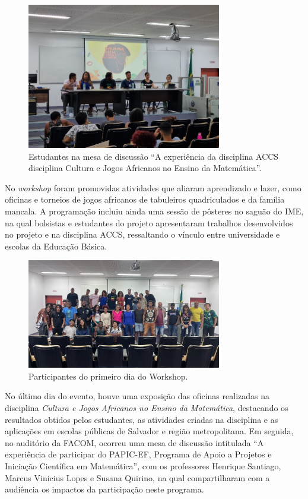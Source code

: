 \documentclass{hipatia}
\begin{document}
\begin{figure}[htb]
    \centering
    \includegraphics[width=8.5cm]{WAM2.jpg}
    \caption{Estudantes na mesa de discussão ``A experiência da disciplina ACCS disciplina Cultura e Jogos Africanos no Ensino da Matemática''.}
 \label{WAM2}
\end{figure}

No \textit{workshop} foram promovidas atividades que aliaram aprendizado e lazer, como oficinas e torneios de jogos africanos de tabuleiros quadriculados e da família mancala. A programação incluiu ainda uma sessão de pôsteres no saguão do IME, na qual bolsistas e estudantes do projeto apresentaram trabalhos desenvolvidos no projeto e na disciplina ACCS, ressaltando o vínculo entre universidade e escolas da Educação Básica.

\begin{figure}[htb]
    \centering
    \includegraphics[width=8.5cm]{WAM3.jpg}
    \caption{Participantes do primeiro dia do Workshop.}
 \label{WAM3}
\end{figure}

No último dia do evento, houve uma exposição das oficinas realizadas na disciplina \textit{Cultura e Jogos Africanos no Ensino da Matemática}, destacando os resultados obtidos pelos estudantes, as atividades criadas na disciplina e as aplicações em escolas públicas de Salvador e região metropolitana. Em seguida, no auditório da FACOM, ocorreu uma mesa de discussão intitulada ``A experiência de participar do PAPIC-EF, Programa de Apoio a Projetos e Iniciação Científica em Matemática'', com os professores Henrique Santiago, Marcus Vinicius Lopes e Susana Quirino, na qual compartilharam com a audiência os impactos da participação neste programa.
\end{document}
